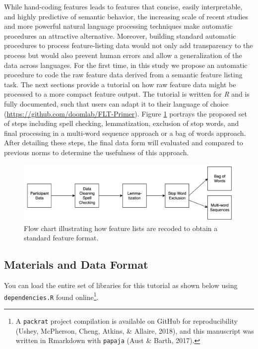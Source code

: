 \documentclass[man]{apa6}
\let\rmarkdownfootnote\footnote%
\def\footnote{\protect\rmarkdownfootnote}
\begin{document}
While hand-coding features leads to features that concise, easily interpretable, and highly predictive of semantic behavior, the increasing scale of recent studies and more powerful natural language processing techniques make automatic procedures an attractive alternative. Moreover, building standard automatic procedures to process feature-listing data would not only add transparency to the process but would also prevent human errors and allow a generalization of the data across languages. For the first time, in this study we propose an automatic procedure to code the raw feature data derived from a semantic feature listing task. The next sections provide a tutorial on how raw feature data might be processed to a more compact feature output. The tutorial is written for \emph{R} and is fully documented, such that users can adapt it to their language of choice (\url{https://github.com/doomlab/FLT-Primer}). Figure \ref{fig:flowchart} portrays the proposed set of steps including spell checking, lemmatization, exclusion of stop words, and final processing in a multi-word sequence approach or a bag of words approach. After detailing these steps, the final data form will evaluated and compared to previous norms to determine the usefulness of this approach.

\begin{figure}
\includegraphics[width=5.24in]{flow_chart} \caption{Flow chart illustrating how feature lists are recoded to obtain a standard feature format.}\label{fig:flowchart}
\end{figure}

\hypertarget{materials-and-data-format}{%
\subsection{Materials and Data Format}\label{materials-and-data-format}}

You can load the entire set of libraries for this tutorial as shown below using \texttt{dependencies.R} found online\footnote{A \texttt{packrat} project compilation is available on GitHub for reproducibility (Ushey, McPherson, Cheng, Atkins, \& Allaire, 2018), and this manuscript was written in Rmarkdown with \texttt{papaja} (Aust \& Barth, 2017).}.
\end{document}
